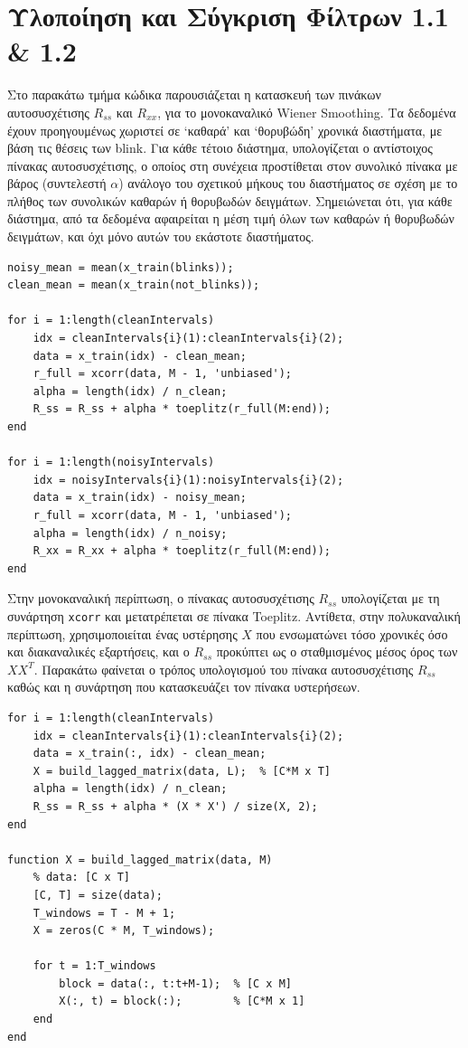 \documentclass[12pt]{article} %
\begin{document}
\newpage
\section*{Υλοποίηση και Σύγκριση Φίλτρων 1.1 \& 1.2}

Στο παρακάτω τμήμα κώδικα παρουσιάζεται η κατασκευή των πινάκων αυτοσυσχέτισης $R_{ss}$ και $R_{xx}$, 
για το μονοκαναλικό Wiener Smoothing. Τα δεδομένα έχουν προηγουμένως χωριστεί 
σε `καθαρά' και `θορυβώδη' χρονικά διαστήματα, με βάση τις θέσεις των blink. Για κάθε τέτοιο διάστημα, 
υπολογίζεται ο αντίστοιχος πίνακας αυτοσυσχέτισης, ο οποίος στη συνέχεια προστίθεται στον συνολικό πίνακα 
με βάρος (συντελεστή $\alpha$) ανάλογο του σχετικού μήκους του διαστήματος σε σχέση με το πλήθος των συνολικών 
καθαρών ή θορυβωδών δειγμάτων. Σημειώνεται ότι, για κάθε διάστημα, από τα δεδομένα αφαιρείται η μέση τιμή 
όλων των καθαρών ή θορυβωδών δειγμάτων, και όχι μόνο αυτών του εκάστοτε διαστήματος.

\begin{lstlisting}
noisy_mean = mean(x_train(blinks));
clean_mean = mean(x_train(not_blinks));

for i = 1:length(cleanIntervals)
    idx = cleanIntervals{i}(1):cleanIntervals{i}(2);
    data = x_train(idx) - clean_mean;
    r_full = xcorr(data, M - 1, 'unbiased');
    alpha = length(idx) / n_clean;
    R_ss = R_ss + alpha * toeplitz(r_full(M:end));
end

for i = 1:length(noisyIntervals)
    idx = noisyIntervals{i}(1):noisyIntervals{i}(2);
    data = x_train(idx) - noisy_mean;
    r_full = xcorr(data, M - 1, 'unbiased');
    alpha = length(idx) / n_noisy;
    R_xx = R_xx + alpha * toeplitz(r_full(M:end));
end
\end{lstlisting}

Στην μονοκαναλική περίπτωση, ο πίνακας αυτοσυσχέτισης $R_{ss}$ υπολογίζεται με τη συνάρτηση 
\texttt{xcorr} και μετατρέπεται σε πίνακα Toeplitz. Αντίθετα, στην πολυκαναλική περίπτωση, 
χρησιμοποιείται ένας υστέρησης $X$ που ενσωματώνει τόσο χρονικές όσο και διακαναλικές 
εξαρτήσεις, και ο $R_{ss}$ προκύπτει ως ο σταθμισμένος μέσος όρος των $XX^T$. Παρακάτω
φαίνεται ο τρόπος υπολογισμού του πίνακα αυτοσυσχέτισης $R_{ss}$ καθώς και η συνάρτηση που 
κατασκευάζει τον πίνακα υστερήσεων.
\begin{lstlisting}
for i = 1:length(cleanIntervals)
    idx = cleanIntervals{i}(1):cleanIntervals{i}(2);
    data = x_train(:, idx) - clean_mean;
    X = build_lagged_matrix(data, L);  % [C*M x T]
    alpha = length(idx) / n_clean;
    R_ss = R_ss + alpha * (X * X') / size(X, 2);
end

function X = build_lagged_matrix(data, M)
    % data: [C x T]
    [C, T] = size(data);
    T_windows = T - M + 1;
    X = zeros(C * M, T_windows);

    for t = 1:T_windows
        block = data(:, t:t+M-1);  % [C x M]
        X(:, t) = block(:);        % [C*M x 1]
    end
end   
\end{lstlisting}
\end{document}
